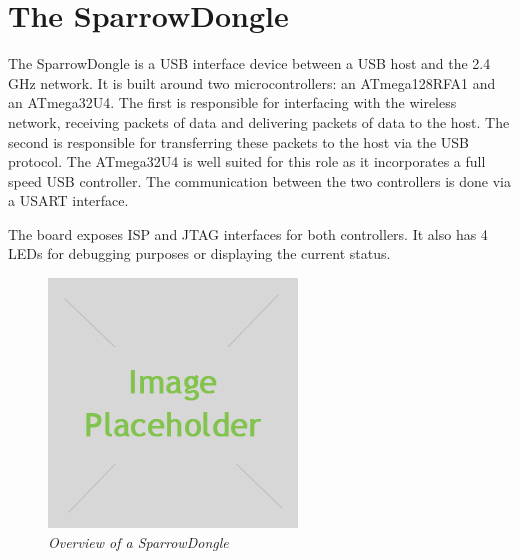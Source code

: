 \section{The SparrowDongle}

The SparrowDongle is a USB interface device between a USB host and the 2.4 GHz
network. It is built around two microcontrollers: an ATmega128RFA1 and an
ATmega32U4. The first is responsible for interfacing with the wireless network,
receiving packets of data and delivering packets of data to the host. The
second is responsible for transferring these packets to the host via the USB
protocol. The ATmega32U4 is well suited for this role as it incorporates a full
speed USB controller. The communication between the two controllers is done via
a USART interface.

The board exposes ISP and JTAG interfaces for both controllers. It also has 4
LEDs for debugging purposes or displaying the current status.

\begin{figure}[ht]
	\begin{center}
		\includegraphics{img/placeholder.jpg}
	\end{center}
	\caption{\small \itshape{Overview of a SparrowDongle}}
\end{figure}

